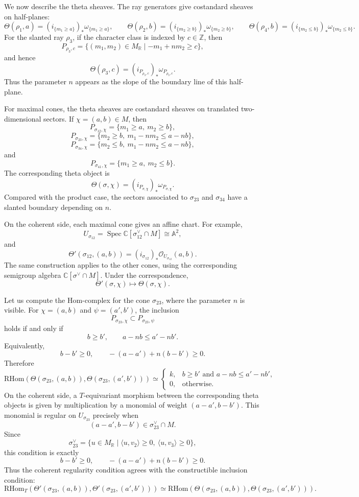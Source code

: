 We now describe the theta sheaves. The ray generators give costandard sheaves
on half-planes:
\[
\Theta(\rho_1,a)
=
(i_{\{m_1\ge a\}})_*\omega_{\{m_1\ge a\}},
\qquad
\Theta(\rho_2,b)
=
(i_{\{m_2\ge b\}})_*\omega_{\{m_2\ge b\}},
\qquad
\Theta(\rho_4,b)
=
(i_{\{m_2\le b\}})_*\omega_{\{m_2\le b\}}.
\]
For the slanted ray \(\rho_3\), if the character class is indexed by
\(c\in\mathbb Z\), then
\[
P_{\rho_3,c}
=
\{(m_1,m_2)\in M_{\mathbb R}\mid -m_1+nm_2\ge c\},
\]
and hence
\[
\Theta(\rho_3,c)
=
(i_{P_{\rho_3,c}})_*\omega_{P_{\rho_3,c}}.
\]
Thus the parameter \(n\) appears as the slope of the boundary line of this
half-plane.

For maximal cones, the theta sheaves are costandard sheaves on translated
two-dimensional sectors. If \(\chi=(a,b)\in M\), then
\[
P_{\sigma_{12},\chi}
=
\{m_1\ge a,\ m_2\ge b\},
\]
\[
P_{\sigma_{23},\chi}
=
\{m_2\ge b,\ m_1-nm_2\le a-nb\},
\]
\[
P_{\sigma_{34},\chi}
=
\{m_2\le b,\ m_1-nm_2\le a-nb\},
\]
and
\[
P_{\sigma_{41},\chi}
=
\{m_1\ge a,\ m_2\le b\}.
\]
The corresponding theta object is
\[
\Theta(\sigma,\chi)
=
(i_{P_{\sigma,\chi}})_*\omega_{P_{\sigma,\chi}}.
\]
Compared with the product case, the sectors associated to \(\sigma_{23}\) and
\(\sigma_{34}\) have a slanted boundary depending on \(n\).

On the coherent side, each maximal cone gives an affine chart. For example,
\[
U_{\sigma_{12}}
=
\operatorname{Spec}\mathbb C[\sigma_{12}^\vee\cap M]
\cong \mathbb A^2,
\]
and
\[
\Theta'(\sigma_{12},(a,b))
=
(i_{\sigma_{12}})_*\mathcal O_{U_{\sigma_{12}}}(a,b).
\]
The same construction applies to the other cones, using the corresponding
semigroup algebra \(\mathbb C[\sigma^\vee\cap M]\). Under the correspondence,
\[
\Theta'(\sigma,\chi)\longmapsto \Theta(\sigma,\chi).
\]

Let us compute the Hom-complex for the cone \(\sigma_{23}\), where the parameter
\(n\) is visible. For \(\chi=(a,b)\) and \(\psi=(a',b')\), the inclusion
\[
P_{\sigma_{23},\chi}\subset P_{\sigma_{23},\psi}
\]
holds if and only if
\[
b\ge b',
\qquad
a-nb\le a'-nb'.
\]
Equivalently,
\[
b-b'\ge 0,
\qquad
-(a-a')+n(b-b')\ge 0.
\]
Therefore
\[
\mathrm{RHom}(\Theta(\sigma_{23},(a,b)),\Theta(\sigma_{23},(a',b')))
\simeq
\begin{cases}
k, & b\ge b'\text{ and }a-nb\le a'-nb',\\
0, & \text{otherwise}.
\end{cases}
\]
On the coherent side, a \(T\)-equivariant morphism between the corresponding
theta objects is given by multiplication by a monomial of weight
\((a-a',b-b')\). This monomial is regular on \(U_{\sigma_{23}}\) precisely when
\[
(a-a',b-b')\in\sigma_{23}^\vee\cap M.
\]
Since
\[
\sigma_{23}^\vee
=
\{u\in M_{\mathbb R}\mid \langle u,v_2\rangle\ge 0,\ 
\langle u,v_3\rangle\ge 0\},
\]
this condition is exactly
\[
b-b'\ge 0,
\qquad
-(a-a')+n(b-b')\ge 0.
\]
Thus the coherent regularity condition agrees with the constructible inclusion
condition:
\[
\mathrm{RHom}_T(\Theta'(\sigma_{23},(a,b)),\Theta'(\sigma_{23},(a',b')))
\simeq
\mathrm{RHom}(\Theta(\sigma_{23},(a,b)),\Theta(\sigma_{23},(a',b'))).
\]

